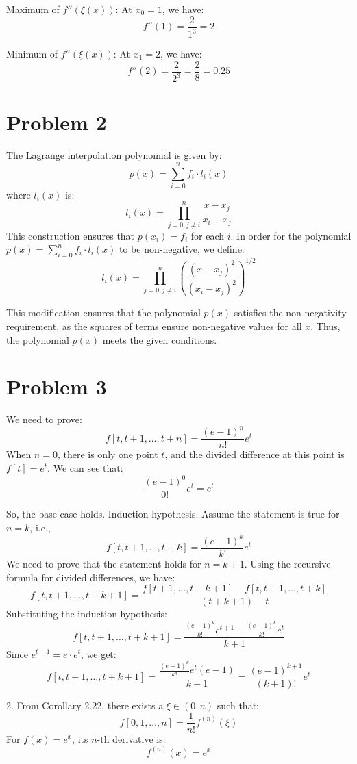\documentclass{article}
\begin{document}
Maximum of \( f''(\xi(x)) \):
At \( x_0 = 1 \), we have:
\[f''(1) = \frac{2}{1^3} = 2\]

Minimum of \( f''(\xi(x)) \):
At \( x_1 = 2 \), we have:
\[f''(2) = \frac{2}{2^3} = \frac{2}{8} = 0.25\]




\section*{Problem 2}
The Lagrange interpolation polynomial is given by:
\[p(x) = \sum_{i=0}^{n} f_i \cdot l_i(x)\]
where \( l_i(x) \) is:
\[l_i(x) = \prod_{j=0, j \neq i}^{n} \frac{x - x_j}{x_i - x_j}\]
This construction ensures that \( p(x_i) = f_i \) for each \( i \).
In order for the polynomial \( p(x) = \sum_{i=0}^{n} f_i \cdot l_i(x) \) to be non-negative, we define:
\[l_i(x) = \prod_{j=0, j \neq i}^{n} \left( \frac{(x - x_j)^2}{(x_i - x_j)^2} \right)^{1/2}\]

This modification ensures that the polynomial \( p(x) \) satisfies the non-negativity requirement, as the squares of terms ensure non-negative values for all \( x \). Thus, the polynomial \( p(x) \) meets the given conditions.


\section*{Problem 3}
We need to prove:
\[f[t, t+1, \dots, t+n] = \frac{(e - 1)^n}{n!} e^t\]
When \( n = 0 \), there is only one point \( t \), and the divided difference at this point is \( f[t] = e^t \). We can see that:
\[\frac{(e - 1)^0}{0!} e^t = e^t\]

So, the base case holds.
Induction hypothesis:
Assume the statement is true for \( n = k \), i.e.,
\[f[t, t+1, \dots, t+k] = \frac{(e - 1)^k}{k!} e^t\]
We need to prove that the statement holds for \( n = k+1 \).
Using the recursive formula for divided differences, we have:
\[f[t, t+1, \dots, t+k+1] = \frac{f[t+1, \dots, t+k+1] - f[t, t+1, \dots, t+k]}{(t+k+1) - t}\]
Substituting the induction hypothesis:
\[f[t, t+1, \dots, t+k+1] = \frac{\frac{(e - 1)^k}{k!} e^{t+1} - \frac{(e - 1)^k}{k!} e^t}{k+1}\]
Since \( e^{t+1} = e \cdot e^t \), we get:
\[f[t, t+1, \dots, t+k+1] = \frac{\frac{(e - 1)^k}{k!} e^t (e - 1)}{k+1} = \frac{(e - 1)^{k+1}}{(k+1)!} e^t\]


2. 
From Corollary 2.22, there exists a \( \xi \in (0, n) \) such that:
\[f[0, 1, \dots, n] = \frac{1}{n!} f^{(n)}(\xi)\]
For \( f(x) = e^x \), its \( n \)-th derivative is:
\[f^{(n)}(x) = e^x\]
\end{document}
